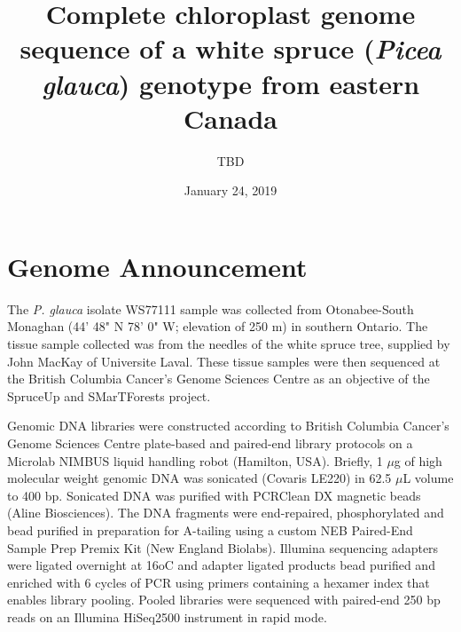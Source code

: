 \documentclass[titlepage,11pt, oneside]{article}   	%
\title{\textbf{Complete chloroplast genome sequence of a white spruce (\textit{Picea glauca}) genotype from eastern Canada}}
\author{TBD}
\date{January 24, 2019}					%
\begin{document}
\maketitle

\section*{Genome Announcement}

The \textit{P. glauca} isolate WS77111 sample was collected from Otonabee-South Monaghan (44' 48" N 78' 0" W; elevation of 250 m) in southern Ontario. The tissue sample collected was from the needles of the white spruce tree, supplied by John MacKay of Universite Laval. These tissue samples were then sequenced at the British Columbia Cancer’s Genome Sciences Centre as an objective of the SpruceUp and SMarTForests project.
\newline
\par
Genomic DNA libraries were constructed according to British Columbia Cancer’s Genome Sciences Centre plate-based and paired-end library protocols on a Microlab NIMBUS liquid handling robot (Hamilton, USA). Briefly, 1 $\mu$g of high molecular weight genomic DNA was sonicated (Covaris LE220) in 62.5 $\mu$L volume to 400 bp. Sonicated DNA was purified with PCRClean DX magnetic beads (Aline Biosciences). The DNA fragments were end-repaired, phosphorylated and bead purified in preparation for A-tailing using a custom NEB Paired-End Sample Prep Premix Kit (New England Biolabs).  Illumina sequencing adapters were ligated overnight at 16oC and adapter ligated products bead purified and enriched with 6 cycles of PCR using primers containing a hexamer index that enables library pooling. Pooled libraries were sequenced with paired-end 250 bp reads on an Illumina HiSeq2500 instrument in rapid mode.
\newline
\par
\end{document}
